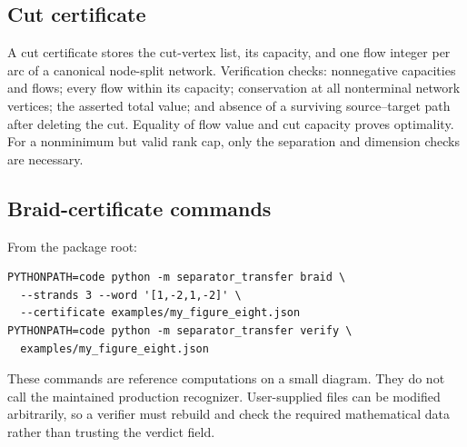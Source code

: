 \documentclass[11pt,letterpaper]{article}
\theoremstyle{definition}\newtheorem{definition}[theorem]{Definition}
\theoremstyle{remark}\newtheorem{remark}[theorem]{Remark}
\begin{document}
\subsection{Cut certificate}
A cut certificate stores the cut-vertex list, its capacity, and one flow
integer per arc of a canonical node-split network. Verification checks:
nonnegative capacities and flows; every flow within its capacity; conservation
at all nonterminal network vertices; the asserted total value; and absence
of a surviving source--target path after deleting the cut. Equality of flow
value and cut capacity proves optimality. For a nonminimum but valid rank
cap, only the separation and dimension checks are necessary.

\subsection{Braid-certificate commands}
From the package root:
\begin{lstlisting}
PYTHONPATH=code python -m separator_transfer braid \
  --strands 3 --word '[1,-2,1,-2]' \
  --certificate examples/my_figure_eight.json
PYTHONPATH=code python -m separator_transfer verify \
  examples/my_figure_eight.json
\end{lstlisting}
These commands are reference computations on a small diagram. They do not
call the maintained production recognizer. User-supplied files can be
modified arbitrarily, so a verifier must rebuild and check the required
mathematical data rather than trusting the verdict field.
\end{document}
